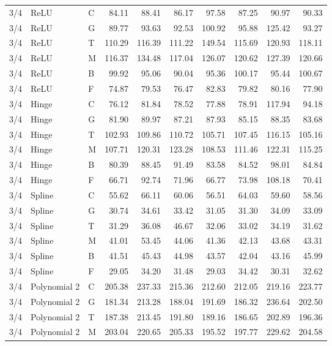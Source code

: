 \begin{longtable}{lllrrrrrrr}
3/4 & ReLU & C & 84.11 & 88.41 & 86.17 & 97.58 & 87.25 & 90.97 & 90.33 \\
3/4 & ReLU & G & 89.77 & 93.63 & 92.53 & 100.92 & 95.88 & 125.42 & 93.27 \\
3/4 & ReLU & T & 110.29 & 116.39 & 111.22 & 149.54 & 115.69 & 120.93 & 118.11 \\
3/4 & ReLU & M & 116.37 & 134.48 & 117.04 & 126.07 & 120.62 & 127.39 & 120.66 \\
3/4 & ReLU & B & 99.92 & 95.06 & 90.04 & 95.36 & 100.17 & 95.44 & 100.67 \\
3/4 & ReLU & F & 74.87 & 79.53 & 76.47 & 82.83 & 79.82 & 80.16 & 77.90 \\
3/4 & Hinge & C & 76.12 & 81.84 & 78.52 & 77.88 & 78.91 & 117.94 & 94.18 \\
3/4 & Hinge & G & 81.90 & 89.97 & 87.21 & 87.93 & 85.15 & 88.35 & 83.68 \\
3/4 & Hinge & T & 102.93 & 109.86 & 110.72 & 105.71 & 107.45 & 116.15 & 105.16 \\
3/4 & Hinge & M & 107.71 & 120.31 & 123.28 & 108.53 & 111.46 & 122.31 & 115.25 \\
3/4 & Hinge & B & 80.39 & 88.45 & 91.49 & 83.58 & 84.52 & 98.01 & 84.84 \\
3/4 & Hinge & F & 66.71 & 92.74 & 71.96 & 66.77 & 73.98 & 108.18 & 70.41 \\
3/4 & Spline & C & 55.62 & 66.11 & 60.06 & 56.51 & 64.03 & 59.60 & 58.56 \\
3/4 & Spline & G & 30.74 & 34.61 & 33.42 & 31.05 & 31.30 & 34.09 & 33.09 \\
3/4 & Spline & T & 31.29 & 36.08 & 46.67 & 32.06 & 33.02 & 34.19 & 31.62 \\
3/4 & Spline & M & 41.01 & 53.45 & 44.06 & 41.36 & 42.13 & 43.68 & 43.31 \\
3/4 & Spline & B & 41.51 & 45.43 & 44.98 & 43.57 & 42.04 & 43.16 & 45.99 \\
3/4 & Spline & F & 29.05 & 34.20 & 31.48 & 29.03 & 34.42 & 30.31 & 32.62 \\
3/4 & Polynomial 2 & C & 205.38 & 237.33 & 215.36 & 212.60 & 212.05 & 219.16 & 223.77 \\
3/4 & Polynomial 2 & G & 181.34 & 213.28 & 188.04 & 191.69 & 186.32 & 236.64 & 202.50 \\
3/4 & Polynomial 2 & T & 187.38 & 213.45 & 191.80 & 189.16 & 186.65 & 202.89 & 196.36 \\
3/4 & Polynomial 2 & M & 203.04 & 220.65 & 205.33 & 195.52 & 197.77 & 229.62 & 204.58 \\

\end{longtable}
